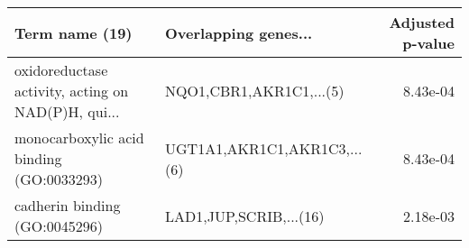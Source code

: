 \begin{tabular}{llr}
\toprule
                                    Term name (19) &        Overlapping genes... &  Adjusted p-value \\
\midrule
oxidoreductase activity, acting on NAD(P)H, qui... &     NQO1,CBR1,AKR1C1,...(5) &          8.43e-04 \\
          monocarboxylic acid binding (GO:0033293) & UGT1A1,AKR1C1,AKR1C3,...(6) &          8.43e-04 \\
                     cadherin binding (GO:0045296) &      LAD1,JUP,SCRIB,...(16) &          2.18e-03 \\
\bottomrule
\end{tabular}
